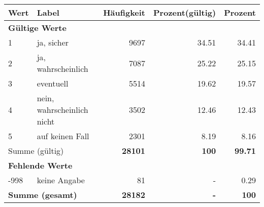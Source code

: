      \begin{longtable}{lXrrr}
     \toprule
     \textbf{Wert} & \textbf{Label} & \textbf{Häufigkeit} & \textbf{Prozent(gültig)} & \textbf{Prozent} \\
     \endhead
     \midrule
     \multicolumn{5}{l}{\textbf{Gültige Werte}}\\

     1 &
     \multicolumn{1}{X}{ ja, sicher   } &


       \num{9697} &
       \num[round-mode=places,round-precision=2]{34.51} &
         \num[round-mode=places,round-precision=2]{34.41} \\

     2 &
     \multicolumn{1}{X}{ ja, wahrscheinlich   } &


       \num{7087} &
       \num[round-mode=places,round-precision=2]{25.22} &
         \num[round-mode=places,round-precision=2]{25.15} \\

     3 &
     \multicolumn{1}{X}{ eventuell   } &


       \num{5514} &
       \num[round-mode=places,round-precision=2]{19.62} &
         \num[round-mode=places,round-precision=2]{19.57} \\

     4 &
     \multicolumn{1}{X}{ nein, wahrscheinlich nicht   } &


       \num{3502} &
       \num[round-mode=places,round-precision=2]{12.46} &
         \num[round-mode=places,round-precision=2]{12.43} \\

     5 &
     \multicolumn{1}{X}{ auf keinen Fall   } &


       \num{2301} &
       \num[round-mode=places,round-precision=2]{8.19} &
         \num[round-mode=places,round-precision=2]{8.16} \\
     \midrule
     \multicolumn{2}{l}{Summe (gültig)} &
       \textbf{\num{28101}} &
     \textbf{100} &
       \textbf{\num[round-mode=places,round-precision=2]{99.71}} \\
     \multicolumn{5}{l}{\textbf{Fehlende Werte}}\\
       -998 &
       keine Angabe &
         \num{81} &
        - &
         \num[round-mode=places,round-precision=2]{0.29} \\
     \midrule
     \multicolumn{2}{l}{\textbf{Summe (gesamt)}} &
          \textbf{\num{28182}} &
        \textbf{-} &
        \textbf{100} \\
     \bottomrule
     \end{longtable}
     
